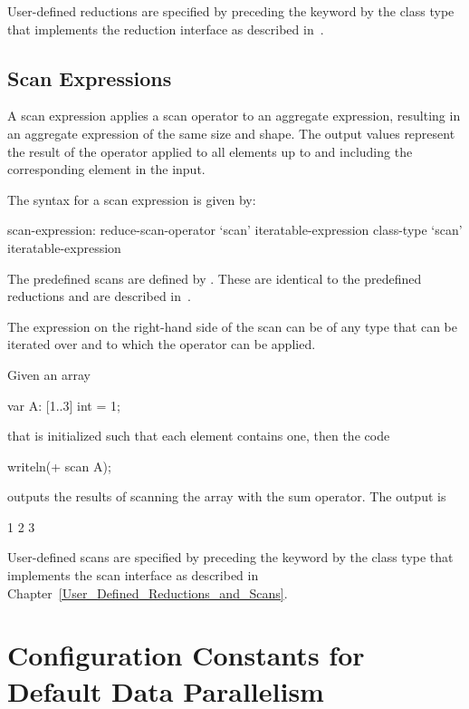 User-defined reductions are specified by preceding the
keyword  by the class type that implements the reduction
interface as described in~.

\subsection{Scan Expressions}
\label{scan}

A scan expression applies a scan operator to an aggregate expression,
resulting in an aggregate expression of the same size and shape.  The
output values represent the result of the operator applied to all
elements up to and including the corresponding element in the input.

The syntax for a scan expression is given by:
\begin{syntax}
scan-expression:
  reduce-scan-operator `scan' iteratable-expression
  class-type `scan' iteratable-expression
\end{syntax}

The predefined scans are defined by .  These
are identical to the predefined reductions and are described
in~.

The expression on the right-hand side of the scan can be of any type
that can be iterated over and to which the operator can be applied.

%
%
\begin{example}
Given an array
\begin{chapel}
var A: [1..3] int = 1;
\end{chapel}
that is initialized such that each element contains one, then the code
\begin{chapel}
writeln(+ scan A);
\end{chapel}
outputs the results of scanning the array with the sum operator.  The
output is
\begin{chapelprintoutput}{}
1 2 3
\end{chapelprintoutput}
\end{example}

User-defined scans are specified by preceding the keyword 
by the class type that implements the scan interface as described
in Chapter~\ref{User_Defined_Reductions_and_Scans}.

\section{Configuration Constants for Default Data Parallelism}
\label{data_parallel_knobs}

